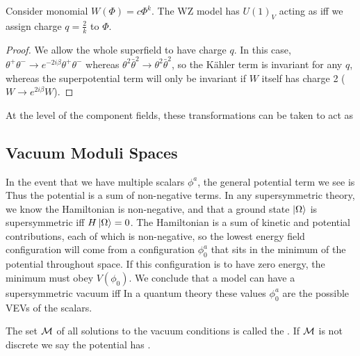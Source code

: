 \documentclass{article}
\begin{document}
\begin{prop}
Consider monomial $W(\Phi) = c\Phi^k$. The WZ model has  $U(1)_V$  acting as 
iff we assign charge $q = \frac{2}{k}$ to $\Phi$.
\end{prop}
\begin{proof}
We allow the whole superfield to have charge $q$. In this case, $\theta^+\theta^- \to e^{-2i\beta} \theta^+\theta^-$ whereas $\theta^2 \bar{\theta}^2 \to \theta^2 \bar{\theta}^2$, so the K\"ahler term is invariant for any $q$, whereas the superpotential term will only be invariant if $W$ itself has charge 2 ($W \to e^{2i\beta} W$).
 \end{proof}
  At the level of the component fields, these transformations can be taken to act as 

\subsection{Vacuum Moduli Spaces}
In the event that we have multiple scalars $\phi^a$, the general potential term we see is 
Thus the potential is a sum of non-negative terms. In any supersymmetric theory, we know the Hamiltonian is non-negative, and that a ground state $\ket{\Omega}$ is
supersymmetric iff $H\ket{\Omega}=0$. The Hamiltonian is a sum of kinetic and potential contributions, each of which is non-negative, so the lowest energy field configuration will come
from a configuration $\phi_0^a$ that sits in the minimum of the potential throughout space. If
this configuration is to have zero energy, the minimum must obey $V(\phi_0)$. We conclude
that a model can have a supersymmetric vacuum iff
In a quantum theory these values $\phi_0^a$ are the possible VEVs of the scalars. 
\begin{definition}
	The set $\mathcal{M}$ of all solutions to the vacuum conditions is called the . If $\mathcal{M}$ is not discrete we say the potential has .
\end{definition}
\end{document}
